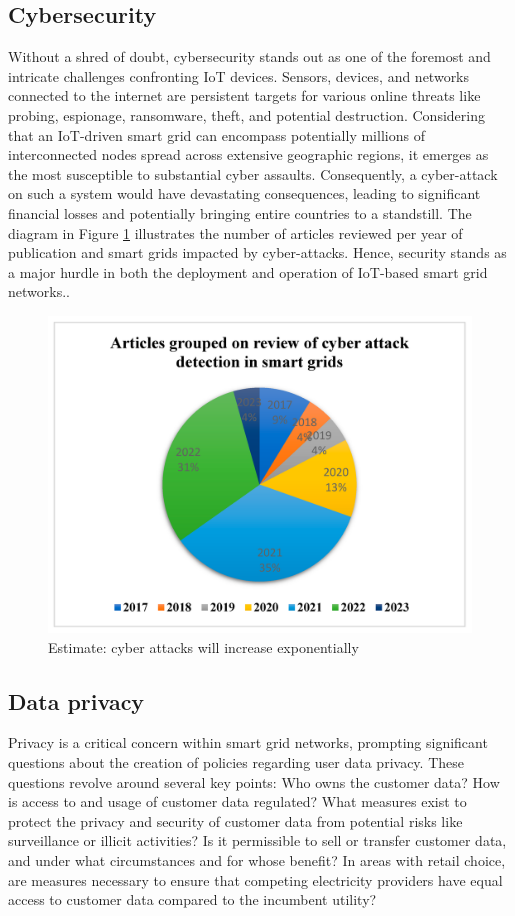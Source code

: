 \subsection{Cybersecurity}
Without a shred of doubt, cybersecurity stands out as one of the foremost and intricate challenges confronting IoT devices. Sensors, devices, and networks connected to the internet are persistent targets for various online threats like probing, espionage, ransomware, theft, and potential destruction. Considering that an IoT-driven smart grid can encompass potentially millions of interconnected nodes spread across extensive geographic regions, it emerges as the most susceptible to substantial cyber assaults. Consequently, a cyber-attack on such a system would have devastating consequences, leading to significant financial losses and potentially bringing entire countries to a standstill. The diagram in Figure \ref{fig:attacks} illustrates the number of articles reviewed per year of publication and smart grids impacted by cyber-attacks. Hence, security stands as a major hurdle in both the deployment and operation of IoT-based smart grid networks.\cite{kimani2019cyber}.
\begin{figure}[h]
	\centering
	\includegraphics[width=12cm]{figures/attack.png}
	\caption{Estimate: cyber attacks will increase exponentially \cite{mdpi-link}}
	\label{fig:attacks}
\end{figure}

\subsection{Data privacy}
Privacy is a critical concern within smart grid networks, prompting significant questions about the creation of policies regarding user data privacy. These questions revolve around several key points: Who owns the customer data? How is access to and usage of customer data regulated? What measures exist to protect the privacy and security of customer data from potential risks like surveillance or illicit activities? Is it permissible to sell or transfer customer data, and under what circumstances and for whose benefit? In areas with retail choice, are measures necessary to ensure that competing electricity providers have equal access to customer data compared to the incumbent utility?

